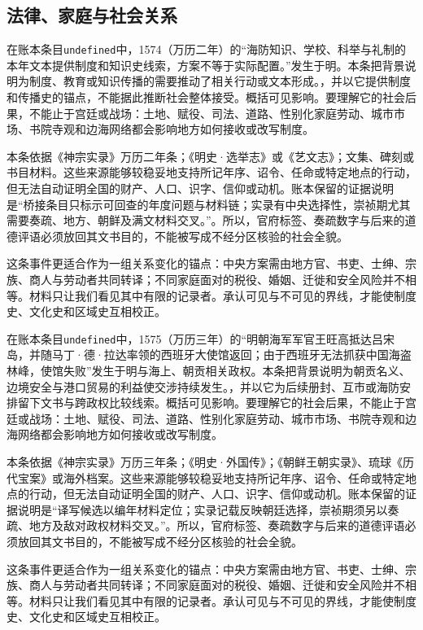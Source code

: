\subsection{法律、家庭与社会关系}

在账本条目\texttt{undefined}中，1574（万历二年）的“海防知识、学校、科举与礼制的本年文本提供制度和知识史线索，方案不等于实际配置。”发生于明。本条把背景说明为制度、教育或知识传播的需要推动了相关行动或文本形成。，并以它提供制度和传播史的锚点，不能据此推断社会整体接受。概括可见影响。要理解它的社会后果，不能止于宫廷或战场：土地、赋役、司法、道路、性别化家庭劳动、城市市场、书院寺观和边海网络都会影响地方如何接收或改写制度。

本条依据《神宗实录》万历二年条；《明史·选举志》或《艺文志》；文集、碑刻或书目材料。这些来源能够较稳妥地支持所记年序、诏令、任命或特定地点的行动，但无法自动证明全国的财产、人口、识字、信仰或动机。账本保留的证据说明是“桥接条目只标示可回查的年度问题与材料链；实录有中央选择性，崇祯期尤其需要奏疏、地方、朝鲜及满文材料交叉。”。所以，官府标签、奏疏数字与后来的道德评语必须放回其文书目的，不能被写成不经分区核验的社会全貌。

这条事件更适合作为一组关系变化的锚点：中央方案需由地方官、书吏、士绅、宗族、商人与劳动者共同转译；不同家庭面对的税役、婚姻、迁徙和安全风险并不相等。材料只让我们看见其中有限的记录者。承认可见与不可见的界线，才能使制度史、文化史和区域史互相校正。

在账本条目\texttt{undefined}中，1575（万历三年）的“明朝海军军官王旺高抵达吕宋岛，并随马丁·德·拉达率领的西班牙大使馆返回；由于西班牙无法抓获中国海盗林峰，使馆失败”发生于明与海上、朝贡相关政权。本条把背景说明为朝贡名义、边境安全与港口贸易的利益使交涉持续发生。，并以它为后续册封、互市或海防安排留下文书与跨政权比较线索。概括可见影响。要理解它的社会后果，不能止于宫廷或战场：土地、赋役、司法、道路、性别化家庭劳动、城市市场、书院寺观和边海网络都会影响地方如何接收或改写制度。

本条依据《神宗实录》万历三年条；《明史·外国传》；《朝鲜王朝实录》、琉球《历代宝案》或海外档案。这些来源能够较稳妥地支持所记年序、诏令、任命或特定地点的行动，但无法自动证明全国的财产、人口、识字、信仰或动机。账本保留的证据说明是“译写候选以编年材料定位；实录记载反映朝廷选择，崇祯期须另以奏疏、地方及敌对政权材料交叉。”。所以，官府标签、奏疏数字与后来的道德评语必须放回其文书目的，不能被写成不经分区核验的社会全貌。

这条事件更适合作为一组关系变化的锚点：中央方案需由地方官、书吏、士绅、宗族、商人与劳动者共同转译；不同家庭面对的税役、婚姻、迁徙和安全风险并不相等。材料只让我们看见其中有限的记录者。承认可见与不可见的界线，才能使制度史、文化史和区域史互相校正。

